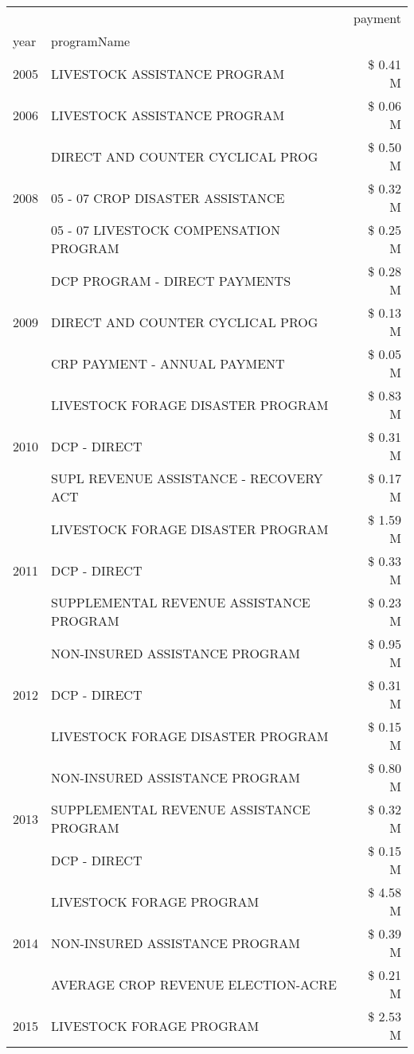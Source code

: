 \begin{tabular}{llr}
\toprule
 &  & payment \\
year & programName &  \\
\midrule
2005 & LIVESTOCK ASSISTANCE PROGRAM & \$ 0.41 M \\
\cline{1-3}
2006 & LIVESTOCK ASSISTANCE PROGRAM & \$ 0.06 M \\
\cline{1-3}
\multirow[t]{3}{*}{2008} & DIRECT AND COUNTER CYCLICAL PROG & \$ 0.50 M \\
 & 05 - 07 CROP DISASTER ASSISTANCE & \$ 0.32 M \\
 & 05 - 07 LIVESTOCK COMPENSATION PROGRAM & \$ 0.25 M \\
\cline{1-3}
\multirow[t]{3}{*}{2009} & DCP PROGRAM - DIRECT PAYMENTS & \$ 0.28 M \\
 & DIRECT AND COUNTER CYCLICAL PROG & \$ 0.13 M \\
 & CRP PAYMENT - ANNUAL PAYMENT & \$ 0.05 M \\
\cline{1-3}
\multirow[t]{3}{*}{2010} & LIVESTOCK FORAGE DISASTER PROGRAM & \$ 0.83 M \\
 & DCP - DIRECT & \$ 0.31 M \\
 & SUPL REVENUE ASSISTANCE - RECOVERY ACT & \$ 0.17 M \\
\cline{1-3}
\multirow[t]{3}{*}{2011} & LIVESTOCK FORAGE DISASTER PROGRAM & \$ 1.59 M \\
 & DCP - DIRECT & \$ 0.33 M \\
 & SUPPLEMENTAL REVENUE ASSISTANCE PROGRAM & \$ 0.23 M \\
\cline{1-3}
\multirow[t]{3}{*}{2012} & NON-INSURED ASSISTANCE PROGRAM & \$ 0.95 M \\
 & DCP - DIRECT & \$ 0.31 M \\
 & LIVESTOCK FORAGE DISASTER PROGRAM & \$ 0.15 M \\
\cline{1-3}
\multirow[t]{3}{*}{2013} & NON-INSURED ASSISTANCE PROGRAM & \$ 0.80 M \\
 & SUPPLEMENTAL REVENUE ASSISTANCE PROGRAM & \$ 0.32 M \\
 & DCP - DIRECT & \$ 0.15 M \\
\cline{1-3}
\multirow[t]{3}{*}{2014} & LIVESTOCK FORAGE PROGRAM & \$ 4.58 M \\
 & NON-INSURED ASSISTANCE PROGRAM & \$ 0.39 M \\
 & AVERAGE CROP REVENUE ELECTION-ACRE & \$ 0.21 M \\
\cline{1-3}
\multirow[t]{3}{*}{2015} & LIVESTOCK FORAGE PROGRAM & \$ 2.53 M \\

\end{tabular}
